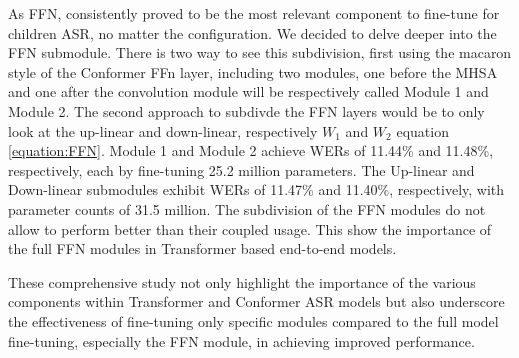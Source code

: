 As FFN, consistently proved to be the most relevant component to fine-tune for children ASR, no matter the configuration. We decided to delve deeper into the FFN submodule. There is two way to see this subdivision, first using the macaron style of the Conformer FFn layer, including two modules, one before the MHSA and one after the convolution module will be respectively called Module 1 and Module 2. The second approach to subdivde the FFN layers would be to only look at the up-linear and down-linear, respectively $W_1$ and $W_2$ equation \ref{equation:FFN}. Module 1 and Module 2 achieve WERs of 11.44\% and 11.48\%, respectively, each by fine-tuning 25.2 million parameters. The Up-linear and Down-linear  submodules exhibit WERs of 11.47\% and 11.40\%, respectively, with parameter counts of 31.5 million. The subdivision of the FFN modules do not allow to perform better than their coupled usage. This show the importance of the full FFN modules in Transformer based end-to-end models. 

These comprehensive study not only highlight the importance of the various components within Transformer and Conformer ASR models but also underscore the effectiveness of fine-tuning only specific modules compared to the full model fine-tuning, especially the FFN module, in achieving improved performance.

